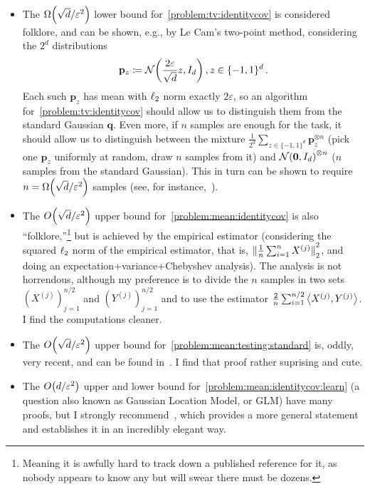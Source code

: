 \documentclass[10pt]{article}
\newcommand{\dst}{\varepsilon}
\newcommand{\ns}{n}
\newcommand{\dims}{d}
\newcommand{\p}{\mathbf{p}}
\newcommand{\q}{\mathbf{q}}
\renewcommand{\eqdef}{\coloneqq}
\theoremstyle{plain}
\begin{document}
\begin{itemize}
  \item 
The $\bigOmega{\sqrt{\dims}/\dst^2}$ lower bound for~\autoref{problem:tv:identitycov} is considered folklore, and can be shown, e.g., by Le Cam's two-point method, considering the $2^\dims$ distributions 
\[
    \p_z \eqdef \gaussian{\frac{2\dst}{\sqrt{\dims}}z}{I_\dims}, z\in\{-1,1\}^\dims\,.
\]
Each such $\p_z$ has mean with $\lp[2]$ norm exactly $2\dst$, so an algorithm for~\autoref{problem:tv:identitycov} should allow us to distinguish them from the standard Gaussian $\q$. Even more, if $\ns$ samples are enough for the task, it should allow us to distinguish between the mixture $\frac{1}{2^\dims} \sum_{z\in\{-1,1\}^\dims} \p_z^{\otimes \ns}$ (pick one $\p_z$ uniformly at random, draw $\ns$ samples from it) and $\gaussian{\mathbf{0}}{I_{\dims}}^{\otimes \ns}$ ($\ns$ samples from the standard Gaussian). This in turn can be shown to require $\ns=\bigOmega{\sqrt{\dims}/\dst^2}$ samples (see, for instance,~\cite[Chapter~23]{Wu17}).
  \item
The $\bigO{\sqrt{\dims}/\dst^2}$ upper bound for~\autoref{problem:mean:identitycov} is also ``folklore,''\footnote{Meaning it is awfully hard to track down a published reference for it, as nobody appears to know any but will swear there must be dozens.} but is achieved by the empirical estimator (considering the squared $\lp[2]$ norm of the empirical estimator, that is, $\normtwo{\frac{1}{\ns}\sum_{i=1}^\ns X^{(j)}}^2$, and doing an expectation+variance+Chebyshev analysis). The analysis is not horrendous, although my preference is to divide the $\ns$ samples in two sets $(X^{(j)})_{j=1}^{\ns/2}$ and $(Y^{(j)})_{j=1}^{\ns/2}$ and to use the estimator $\frac{2}{\ns}\sum_{i=1}^{\ns/2} \dotprod{X^{(j)}}{Y^{(j)}}$. I find the computations cleaner.
  \item
The $\bigO{\sqrt{\dims}/\dst^2}$ upper bound for~\autoref{problem:mean:testing:standard} is, oddly, very recent, and can be found in~\cite[Section~4]{CanonneCKLW19}. I find that proof rather suprising and cute.

  \item
The $\bigO{\dims/\dst^2}$ upper and lower bound for~\autoref{problem:mean:identitycov:learn} (a question also known as Gaussian Location Model, or GLM) have many proofs, but I strongly recommend~\cite[Section~9.1]{Wu17}, which provides a more general statement and establishes it in an incredibly elegant way.


\end{itemize}
\end{document}
